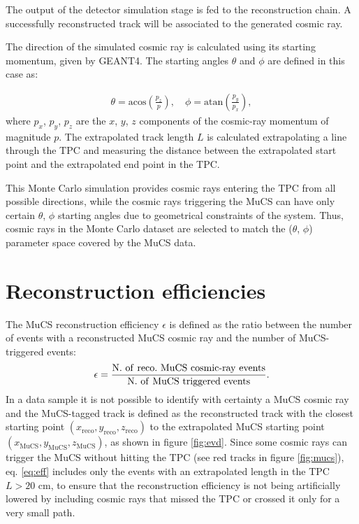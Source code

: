 \documentclass[a4paper,11pt]{article}
\def\myhyphen{{\hbox{-}}}
\begin{document}
The output of the detector simulation stage is fed to the reconstruction chain. A successfully reconstructed track will be associated to the generated cosmic ray.

The direction of the simulated cosmic ray is calculated using its starting momentum, given by GEANT4. The starting angles $\theta$ and $\phi$ are defined in this case as:

\begin{align}\label{eq:angles}
  \theta = \mathrm{acos}\left(\frac{p_{z}}{p}\right), \quad
  \phi = \mathrm{atan}\left(\frac{p_{y}}{p_{x}}\right),
\end{align}
where $p_{x}$, $p_{y}$, $p_{z}$ are the $x$, $y$, $z$ components of the cosmic-ray momentum of magnitude $p$.
The extrapolated track length $L$ is calculated extrapolating a line through the TPC and measuring the distance between the extrapolated start point and the extrapolated end point in the TPC.

This Monte Carlo simulation provides cosmic rays entering the TPC from all possible directions, while the cosmic rays triggering the MuCS can have only certain $\theta$, $\phi$ starting angles due to geometrical constraints of the system. Thus, cosmic rays in the Monte Carlo dataset are selected to match the ($\theta$, $\phi$) parameter space covered by the MuCS data.


\section{Reconstruction efficiencies}\label{sec:reco}

The MuCS reconstruction efficiency $\epsilon$ is defined as the ratio between the number of events with a reconstructed MuCS cosmic ray and the number of MuCS-triggered events:
\begin{equation}\label{eq:eff}
  \epsilon = \frac{\mathrm{N.~of~reco.~MuCS~cosmic\myhyphen ray~events}}{\mathrm{N.~of~MuCS~triggered~events}}.
\end{equation}
In a data sample it is not possible to identify with certainty a MuCS cosmic ray and the MuCS-tagged track is defined as the reconstructed track with the closest starting point $(x_{\mathrm{reco}},y_{\mathrm{reco}},z_{\mathrm{reco}})$ to the extrapolated MuCS starting point $(x_{\mathrm{MuCS}},y_{\mathrm{MuCS}},z_{\mathrm{MuCS}})$, as shown in figure \ref{fig:evd}. Since some cosmic rays can trigger the MuCS without hitting the TPC (see red tracks in figure \ref{fig:mucs}), eq. \eqref{eq:eff} includes only the events with an extrapolated length in the TPC $L > 20$ cm, to ensure that the reconstruction efficiency is not being artificially lowered by including cosmic rays that missed the TPC or crossed it only for a very small path.
\end{document}

